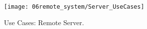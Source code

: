 \begin{figure}[H]
	\centering
	\texttt{[image: 06remote\_system/Server\_UseCases]}
	\caption{Use Cases: Remote Server.}
	\label{fig:UseCases_Server}
\end{figure}
%
%
%
%
%
